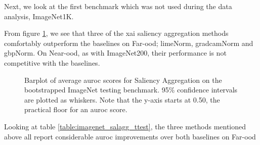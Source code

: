 \documentclass[UKenglish]{uiomasterthesis} %
\theoremstyle{definition}
\begin{document}
Next, we look at the first benchmark which was not used during the data analysis, ImageNet1K. 

From figure \ref{fig:imagenet_salagg_bootstrap_barplot}, we see that three of the \ac{xai} saliency aggregation methods comfortably outperform the baselines on Far-\ac{ood}; \ac{lime}Norm, \ac{gradcam}Norm and \ac{gbp}Norm. On Near-\ac{ood}, as with ImageNet200, their performance is not competitive with the baselines.

\begin{figure}[H]
    \begin{center}
        
    \end{center}
    \caption[ImageNet1K Saliency Aggregation Bootstrap]{Barplot of average \ac{auroc} scores for Saliency Aggregation on the bootstrapped ImageNet testing benchmark. 95\% confidence intervals are plotted as whiskers. Note that the y-axis starts at 0.50, the practical floor for an \ac{auroc} score.}
    \label{fig:imagenet_salagg_bootstrap_barplot}
\end{figure}

Looking at table \ref{table:imagenet_salagg_ttest}, the three methods mentioned above all report considerable \ac{auroc} improvements over both baselines on Far-\ac{ood}
\end{document}
